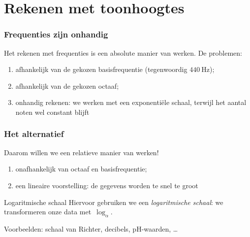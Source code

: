 \documentclass[compress, darktitle, framenumber, totalframenumber, handout]{beamer}
\begin{document}
\section{Rekenen met toonhoogtes}

\begin{frame}
  \frametitle{Frequenties zijn onhandig}

  Het rekenen met frequenties is een \alert{absolute} manier van werken. \pause De problemen:
  \begin{enumerate}
    \item afhankelijk van de gekozen basisfrequentie (tegenwoordig $\SI{440}{\hertz}$);
    \item afhankelijk van de gekozen octaaf;
    \item onhandig rekenen: we werken met een \alert{exponenti\"ele schaal}, terwijl het aantal noten wel constant blijft
  \end{enumerate}
  \begin{center}
  \end{center}
\end{frame}

\begin{frame}
  \frametitle{Het alternatief}
  
  Daarom willen we een \alert{relatieve} manier van werken!
  \begin{enumerate}
    \item onafhankelijk van octaaf en basisfrequentie;
    \item een \alert{lineaire} voorstelling: de gegevens worden te snel te groot
  \end{enumerate}
  \begin{center}
  \end{center}
  \pause
  \begin{block}{Logaritmische schaal}
    Hiervoor gebruiken we een \emph{logaritmische schaal}: we transformeren onze data met~$\log_\alpha$.
  \end{block}
  Voorbeelden: schaal van Richter, decibels, pH-waarden, \ldots
\end{frame}
\end{document}

